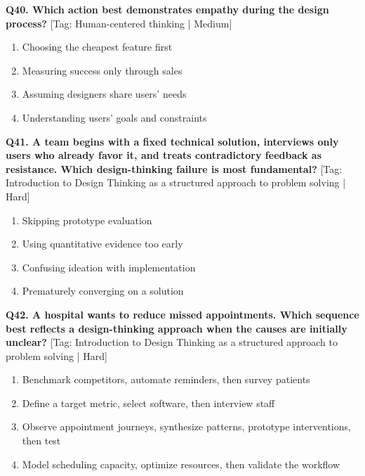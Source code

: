 \noindent\textbf{Q40. Which action best demonstrates empathy during the design process?} \hfill [Tag: Human-centered thinking | Medium]
\begin{enumerate}[label=(\alph*),topsep=2pt,itemsep=1pt,partopsep=0pt,parsep=0pt]
    \item {Choosing the cheapest feature first}
    \item {Measuring success only through sales}
    \item {Assuming designers share users' needs}
    \item {Understanding users' goals and constraints}
\end{enumerate}
\vspace{2mm}

\noindent\textbf{Q41. A team begins with a fixed technical solution, interviews only users who already favor it, and treats contradictory feedback as resistance. Which design-thinking failure is most fundamental?} \hfill [Tag: Introduction to Design Thinking as a structured approach to problem solving | Hard]
\begin{enumerate}[label=(\alph*),topsep=2pt,itemsep=1pt,partopsep=0pt,parsep=0pt]
    \item {Skipping prototype evaluation}
    \item {Using quantitative evidence too early}
    \item {Confusing ideation with implementation}
    \item {Prematurely converging on a solution}
\end{enumerate}
\vspace{2mm}

\noindent\textbf{Q42. A hospital wants to reduce missed appointments. Which sequence best reflects a design-thinking approach when the causes are initially unclear?} \hfill [Tag: Introduction to Design Thinking as a structured approach to problem solving | Hard]
\begin{enumerate}[label=(\alph*),topsep=2pt,itemsep=1pt,partopsep=0pt,parsep=0pt]
    \item {Benchmark competitors, automate reminders, then survey patients}
    \item {Define a target metric, select software, then interview staff}
    \item {Observe appointment journeys, synthesize patterns, prototype interventions, then test}
    \item {Model scheduling capacity, optimize resources, then validate the workflow}
\end{enumerate}
\vspace{2mm}

